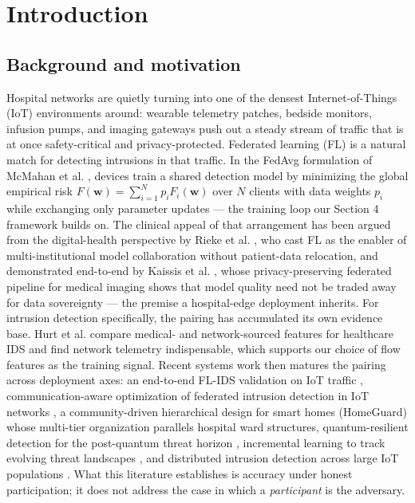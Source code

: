\documentclass[cmc,article,submit,moreauthors,pdftex]{Definitions/tsp}
\begin{document}
\section{Introduction}\label{sec:introduction}

\subsection{Background and motivation}\label{sec:background-and-motivation}

Hospital networks are quietly turning into one of the densest Internet-of-Things (IoT) environments around: wearable telemetry patches, bedside monitors, infusion pumps, and imaging gateways push out a steady stream of traffic that is at once safety-critical and privacy-protected. Federated learning (FL) is a natural match for detecting intrusions in that traffic. In the FedAvg formulation of McMahan et al. \cite{ref-1}, devices train a shared detection model by minimizing the global empirical risk $F(\mathbf{w}) = \sum_{i=1}^{N} p_i F_i(\mathbf{w})$ over $N$ clients with data weights $p_i$ while exchanging only parameter updates --- the training loop our Section 4 framework builds on. The clinical appeal of that arrangement has been argued from the digital-health perspective by Rieke et al. \cite{ref-2}, who cast FL as the enabler of multi-institutional model collaboration without patient-data relocation, and demonstrated end-to-end by Kaissis et al. \cite{ref-3}, whose privacy-preserving federated pipeline for medical imaging shows that model quality need not be traded away for data sovereignty --- the premise a hospital-edge deployment inherits. For intrusion detection specifically, the pairing has accumulated its own evidence base. Hurt et al. \cite{ref-4} compare medical- and network-sourced features for healthcare IDS and find network telemetry indispensable, which supports our choice of flow features as the training signal. Recent systems work then matures the pairing across deployment axes: an end-to-end FL-IDS validation on IoT traffic \cite{ref-5}, communication-aware optimization of federated intrusion detection in IoT networks \cite{ref-6}, a community-driven hierarchical design for smart homes (HomeGuard) \cite{ref-7} whose multi-tier organization parallels hospital ward structures, quantum-resilient detection for the post-quantum threat horizon \cite{ref-8}, incremental learning to track evolving threat landscapes \cite{ref-9}, and distributed intrusion detection across large IoT populations \cite{ref-10}. What this literature establishes is accuracy under honest participation; it does not address the case in which a \emph{participant} is the adversary.
\end{document}
